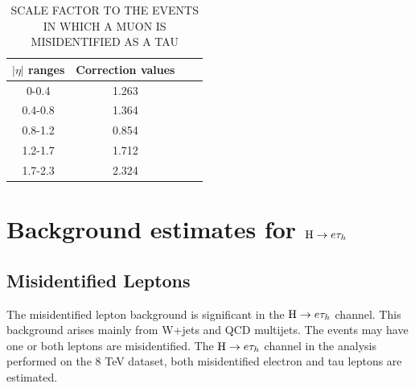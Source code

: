 \begin{table}[htp]
\caption{SCALE FACTOR TO THE EVENTS IN WHICH A MUON IS MISIDENTIFIED AS A TAU} \label{tb:MFTcorrection}
\begin{center}
\begin{tabular}{|c|c|c|c|}
\hline
$|\eta|$ ranges             & Correction values \\\hline
0-0.4                             & 1.263                   \\
0.4-0.8                          & 1.364           \\
0.8-1.2                          & 0.854        \\
1.2-1.7                          & 1.712  \\
1.7-2.3                          & 2.324                                  \\\hline
 \end{tabular}
\end{center}
\end{table}







\section{Background estimates for $\mathrm{H} \to e \tau_{h}$}

\subsection{Misidentified Leptons}

The misidentified lepton background is significant in  the $\mathrm{H} \to e \tau_{h}$ channel. This background arises mainly from W+jets and QCD multijets. The events may have one or both leptons are misidentified. The $\mathrm{H} \to e \tau_{h}$ channel in the analysis performed on the 8 TeV dataset, both misidentified electron and tau leptons are estimated. 

